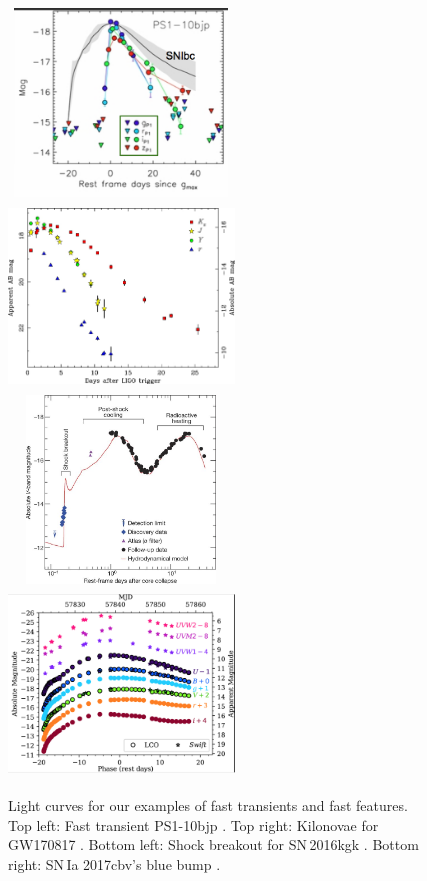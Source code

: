 \documentclass[11pt]{article}
\begin{document}
\begin{center}
\begin{figure}[!h]
\includegraphics[width=6cm,height=5cm]{figures/Drout_PS1-10bjp.png}
\includegraphics[width=6cm,height=5cm]{figures/Tanvir_fig2.jpg}
\includegraphics[width=6cm,height=5cm]{figures/Bersten_16kgk.jpg}
\includegraphics[width=6cm,height=5cm]{figures/Hosseinzadeh_17cbv.png}
\caption{Light curves for our examples of fast transients and fast features. Top left: Fast transient PS1-10bjp \citep{2014ApJ...794...23D}. Top right: Kilonovae for GW170817 \citep{2017ApJ...848L..27T}. Bottom left: Shock breakout for SN\,2016kgk \citep{2018Natur.554..497B}. Bottom right: SN\,Ia 2017cbv's blue bump \citep{2017ApJ...845L..11H}. }
\end{figure}
\end{center}
\end{document}
